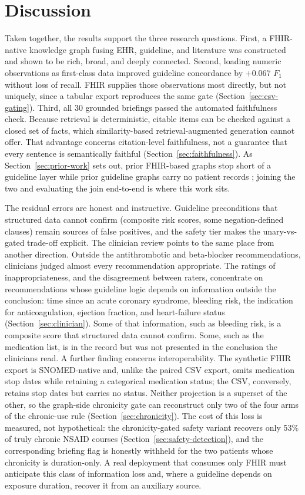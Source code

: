 \section{Discussion}

Taken together, the results support the three research questions. First, a FHIR-native
knowledge graph fusing EHR, guideline, and literature was constructed and shown to be rich,
broad, and deeply connected. Second, loading numeric observations as first-class data
improved guideline concordance by $+0.067$ $F_1$ without loss of recall. FHIR supplies those
observations most directly, but not uniquely, since a tabular export reproduces the same gate
(Section~\ref{sec:csv-gating}). Third, all 30 grounded briefings passed the automated
faithfulness check. Because retrieval is deterministic, citable items can be checked against a
closed set of facts, which similarity-based retrieval-augmented generation cannot offer. That
advantage concerns citation-level faithfulness, not a guarantee that every sentence is
semantically faithful (Section~\ref{sec:faithfulness}). As
Section~\ref{sec:prior-work} sets out, prior FHIR-based graphs stop short of a guideline
layer \cite{xiao2022} while prior guideline graphs carry no patient records
\cite{cui2025}; joining the two and evaluating the join end-to-end is where this work sits.

The residual errors are honest and instructive. Guideline preconditions that structured
data cannot confirm (composite risk scores, some negation-defined clauses) remain sources of
false positives, and the safety tier makes the unary-vs-gated trade-off explicit. The
clinician review points to the same place from another direction. Outside the antithrombotic
and beta-blocker recommendations, clinicians judged almost every recommendation appropriate.
The ratings of inappropriateness, and the disagreement between raters, concentrate on
recommendations whose guideline logic depends on information outside the conclusion: time
since an acute coronary syndrome, bleeding risk, the indication for anticoagulation, ejection
fraction, and heart-failure status (Section~\ref{sec:clinician}). Some of that information,
such as bleeding risk, is a composite score that structured data cannot confirm. Some, such
as the medication list, is in the record but was not presented in the conclusion the
clinicians read. A further finding concerns interoperability. The synthetic FHIR export is SNOMED-native and, unlike the
paired CSV export, omits medication stop dates while retaining a categorical medication
status; the CSV, conversely, retains stop dates but carries no status. Neither projection is
a superset of the other, so the graph-side chronicity gate can reconstruct only two of the
four arms of the chronic-use rule (Section~\ref{sec:chronicity}). The cost of this loss is
measured, not hypothetical: the chronicity-gated safety variant recovers only
53\% of truly chronic NSAID courses (Section~\ref{sec:safety-detection}), and the
corresponding briefing flag is honestly withheld for the two patients whose chronicity is
duration-only. A real deployment that consumes only FHIR must anticipate this class of
information loss and, where a guideline depends on exposure duration, recover it from an
auxiliary source.
